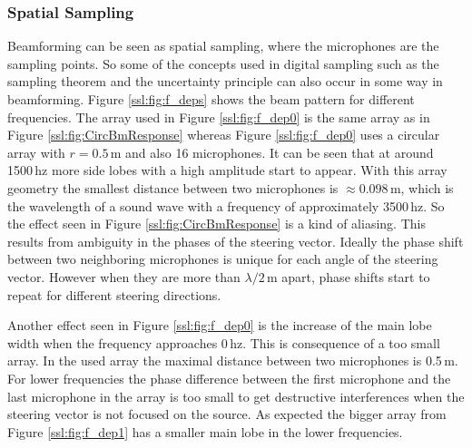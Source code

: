 \subsubsection{Spatial Sampling}
\label{sec:spatSam}
Beamforming can be seen as spatial sampling, where the microphones
are the sampling points.
So some of the concepts used in digital sampling such as
the sampling theorem and the uncertainty principle can also
occur in some way in beamforming.
Figure \ref{ssl:fig:f_deps} shows the beam pattern for different frequencies.
The array used in Figure \ref{ssl:fig:f_dep0} is the same array
as in Figure \ref{ssl:fig:CircBmResponse} whereas Figure \ref{ssl:fig:f_dep0}
uses a circular array with $r = 0.5$\,m and also 16 microphones.
It can be seen that at around 1500\,hz more side lobes with a
high amplitude start to appear.
With this array geometry the smallest distance between two
microphones is $\approx 0.098$\,m, which is the wavelength
of a sound wave with a frequency of approximately 3500\,hz.
So the effect seen in Figure \ref{ssl:fig:CircBmResponse} is
a kind of aliasing.
This results from ambiguity in the phases of the steering vector.
Ideally the phase shift between two neighboring microphones is unique
for each angle of the steering vector.
However when they are more than $\lambda/2$\,m apart, phase shifts start to
repeat for different steering directions.

Another effect seen in Figure \ref{ssl:fig:f_dep0} is the increase
of the main lobe width when the frequency approaches 0\,hz.
This is consequence of a too small array.
In the used array the maximal distance between two microphones is 0.5\,m.
For lower frequencies the phase difference between the first microphone and
the last microphone in the array is too small to get destructive
interferences when the steering vector is not focused on the source.
As expected the bigger array from Figure \ref{ssl:fig:f_dep1} has a smaller
main lobe in the lower frequencies.

